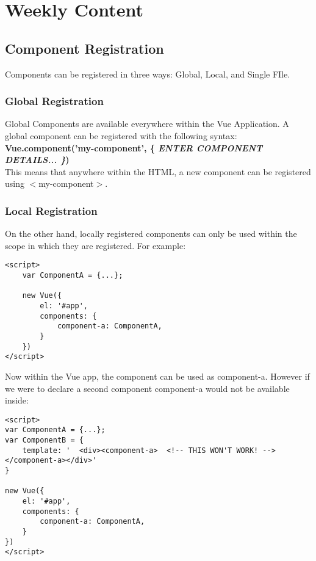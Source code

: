 \documentclass[portfolio.tex]{subfiles}
\begin{document}
	\section{Weekly Content}

	\subsection{Component Registration}
		\label{vue-component-registration}
		Components can be registered in three ways: Global, Local, and Single FIle.
		\subsubsection{Global Registration}
			Global Components are available everywhere within the Vue Application.  A global component can be registered with the following syntax:\\

				\noindent \textbf{Vue.component('my-component', \{ \textit{ENTER COMPONENT DETAILS... \}})}\\

				 \noindent This means that anywhere within the HTML, a new component can be registered using $<$my-component$>$.


		\subsubsection{Local Registration}
			On the other hand, locally registered components can only be used within the scope in which they are registered. For example:\\

			\begin{lstlisting}
<script>
	var ComponentA = {...};

	new Vue({
		el: '#app',
		components: {
			component-a: ComponentA,
		}
	})
</script>
			\end{lstlisting}
		\bigbreak

		Now within the Vue app, the component can be used as component-a. However if we were to declare a second component component-a would not be available inside:\\

		\begin{lstlisting}
<script>
var ComponentA = {...};
var ComponentB = {
	template: '  <div><component-a>  <!-- THIS WON'T WORK! --> </component-a></div>'
}

new Vue({
	el: '#app',
	components: {
		component-a: ComponentA,
	}
})
</script>
		\end{lstlisting}
\end{document}
